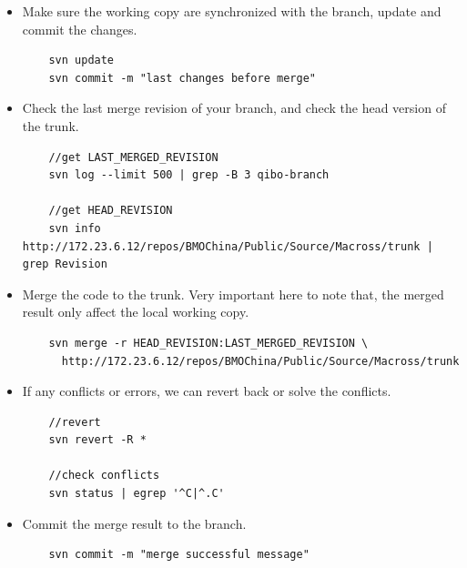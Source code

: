 \begin{itemize}
\item
	Make sure the working copy are synchronized with the branch, update and commit the changes.
	\begin{lstlisting}
	svn update 
	svn commit -m "last changes before merge"
	\end{lstlisting}

\item
	Check the last merge revision of your branch, and check the head version of the trunk.
	\begin{lstlisting}
	//get LAST_MERGED_REVISION
	svn log --limit 500 | grep -B 3 qibo-branch
	
	//get HEAD_REVISION 											  
	svn info http://172.23.6.12/repos/BMOChina/Public/Source/Macross/trunk | grep Revision  
	\end{lstlisting}

\item
	Merge the code to the trunk. Very important here to note that, the merged result only affect the local working copy.
	\begin{lstlisting}
	svn merge -r HEAD_REVISION:LAST_MERGED_REVISION \
	  http://172.23.6.12/repos/BMOChina/Public/Source/Macross/trunk
	\end{lstlisting}

\item
	If any conflicts or errors, we can revert back or solve the conflicts.
	\begin{lstlisting}
	//revert	
	svn revert -R *
	
	//check conflicts
	svn status | egrep '^C|^.C'
	\end{lstlisting}

\item
	Commit the merge result to the branch.
	\begin{lstlisting}
	svn commit -m "merge successful message"
	\end{lstlisting}
\end{itemize}







